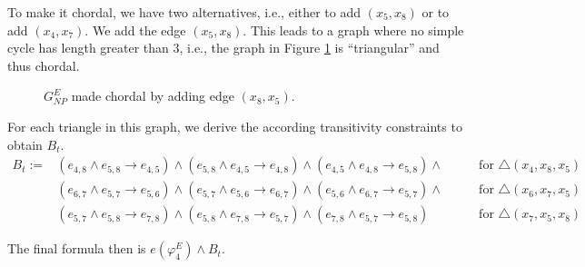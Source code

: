 \documentclass[11pt,a4paper]{uebung}
\begin{document}
{  To make it chordal, we have two alternatives, i.e., either to add
  $(x_5,x_8)$ or to add $(x_4,x_7)$. We add the edge $(x_5,x_8)$. This leads
  to a graph where no simple cycle has length greater than $3$, i.e., the
  graph in Figure \ref{fig:sp4} is ``triangular'' and thus chordal.
  
  \begin{figure}[h]
    \centering
    
    \caption{$G^E_{NP}$ made chordal by adding edge $(x_8,x_5)$.}
    \label{fig:sp4}
  \end{figure}

  For each triangle in this graph, we derive the according transitivity
  constraints to obtain $B_t$.
  \begin{eqnarray*}
    B_t:= &(e_{4,8} \land e_{5,8} \rightarrow e_{4,5}) \land
    (e_{5,8} \land e_{4,5} \rightarrow e_{4,8}) \land
    (e_{4,5} \land e_{4,8} \rightarrow e_{5,8}) \land & \quad \quad \text{for }\triangle
    (x_4,x_8,x_5)\\
    &(e_{6,7} \land e_{5,7} \rightarrow e_{5,6}) \land
    (e_{5,7} \land e_{5,6} \rightarrow e_{6,7}) \land
    (e_{5,6} \land e_{6,7} \rightarrow e_{5,7}) \land & \quad \quad \text{for
    } \triangle (x_6,x_7,x_5)\\
    &(e_{5,7} \land e_{5,8} \rightarrow e_{7,8}) \land
    (e_{5,8} \land e_{7,8} \rightarrow e_{5,7}) \land
    (e_{7,8} \land e_{5,7} \rightarrow e_{5,8}) &\quad \quad\text{for }  \triangle (x_7,x_5,x_8)
  \end{eqnarray*}

  The final formula then is $e(\varphi^E_4) \land B_t$.

}



\newpage


\end{document}
